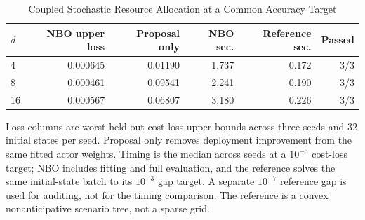 \begin{table}[tbp]
\centering
\caption{Coupled Stochastic Resource Allocation at a Common Accuracy Target}
\label{tab:resource}
\small
\begin{tabular}{@{}lrrrrr@{}}
\toprule
$d$ & NBO upper loss & Proposal only & NBO sec. & Reference sec. & Passed \\
\midrule
4 & 0.000645 & 0.01190 & 1.737 & 0.172 & 3/3 \\
8 & 0.000461 & 0.09541 & 2.241 & 0.190 & 3/3 \\
16 & 0.000567 & 0.06807 & 3.180 & 0.226 & 3/3 \\
\bottomrule
\end{tabular}
\par\smallskip\begin{minipage}{\linewidth}\footnotesize Loss columns are worst held-out cost-loss upper bounds across three seeds and 32 initial states per seed. Proposal only removes deployment improvement from the same fitted actor weights. Timing is the median across seeds at a $10^{-3}$ cost-loss target; NBO includes fitting and full evaluation, and the reference solves the same initial-state batch to its $10^{-3}$ gap target. A separate $10^{-7}$ reference gap is used for auditing, not for the timing comparison. The reference is a convex nonanticipative scenario tree, not a sparse grid.\end{minipage}
\end{table}
